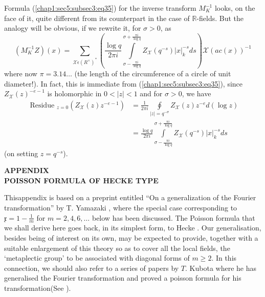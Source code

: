 \begin{remark}\label{chap1:sec5:subsec3:rem2} %
  Formula (\ref{chap1:sec5:subsec3:eq35}) for the inverse transform
  $M_{K}^{-1}$ looks, on the 
  face of it, quite different from its counterpart in the case of
  $\mathbb{R}$-fields. But the analogy will be obvious, if we rewrite
  it, for $\sigma > 0$, as  
  \begin{equation*}
    (M_{K}^{-1}Z)(x)=\sum_{\mathcal{X}\epsilon(R^\times )^{\ast}}
    (\frac{\log q}{2 \pi i} \int\limits_{\sigma-\frac{\pi i}{\log
        q}}^{\sigma+\frac{\pi i}{\log q}}
    Z_{\mathcal{X}}(q^{-s})|x|_{k}^{-s}ds) \mathcal{X}(ac(x))^{-1}
  \end{equation*}
  where now $\pi=3.14\ldots$ (the length of the circumference of a
  circle of unit diameter!). In fact, this is immediate from
  (\ref{chap1:sec5:subsec3:eq35}),
  since $Z_{\mathcal{X}}(z)^{-e-1}$ is holomorphic in $0<|z|<1$ and
  for $\sigma >0$, we have 
  \begin{align*}
    \text{ Residue }_{z=0}(Z_{\mathcal{X}}(z)z^{-e-1})& =\frac{1}{2\pi
      i} \oint\limits_{|z|=q^{-\sigma}}Z_{\mathcal{X}}(z)z^{-e}d(\log z)\\
    &  =\frac{\log q}{2 \pi i}\int\limits_{\sigma-\frac{\pi i}{\log
        q}}^{\sigma+\frac{\pi i}{\log q}}Z_{\mathcal{X}}(q^{-s})|x|_{k}^{-s}ds
  \end{align*}
  (on setting $z=q^{-s}$).
\end{remark}
\newpage

\begin{center}
  \textbf{APPENDIX}\\[10pt]
  \textbf{POISSON FORMULA OF HECKE TYPE}
\end{center}

This\pageoriginale appendix is based on a preprint entitled ``On a generalization of
the Fourier transformation'' by T. Yamazaki \cite{Yam}, where the special
case corresponding to $\mathfrak{x}=1- \frac{1}{m}$ for
$m=2,4,6,\ldots$ below  has been discussed. The Poisson formula that
we shall derive here goes back, in its simplest form, to
Hecke \cite{Hec 1}. 
Our generalisation, besides being of interest on its own, may be
expected to provide, together with a suitable enlargement of this
theory so as to cover all the local fields, the `metaplectic group' to
be associated with diagonal forms of $m\ge2$. In this connection, we
should also refer to a series of papers by $T$. Kubota where he has
generalised the Fourier transformation and proved a poisson formula
for his transformation(See \cite{Kub}).

